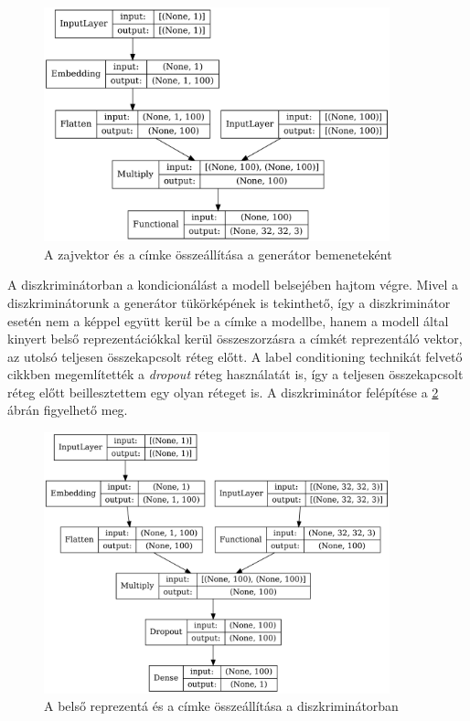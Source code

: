 \begin{figure}[h]
	\centering
	\includegraphics[width=10cm]{images/label_noise_embedding.png}
	\caption{A zajvektor és a címke összeállítása a generátor bemeneteként}
	\label{fig:labelnoiseembedding}
\end{figure}

A diszkriminátorban a kondicionálást a modell belsejében hajtom végre. Mivel a diszkriminátorunk a generátor tükörképének is tekinthető, így a diszkriminátor esetén nem a képpel együtt kerül be a címke a modellbe, hanem a modell által kinyert belső reprezentációkkal kerül összeszorzásra a címkét reprezentáló vektor, az utolsó teljesen összekapcsolt réteg előtt. A label conditioning technikát felvető cikkben megemlítették a \textit{dropout} réteg használatát is, így a teljesen összekapcsolt réteg előtt beillesztettem egy olyan réteget is.
A diszkriminátor felépítése a \ref{fig:labeldiscriminator} ábrán figyelhető meg.

\begin{figure}[h]
	\centering
	\includegraphics[width=10cm]{images/label_discriminator.png}
	\caption{A belső reprezentá és a címke összeállítása a diszkriminátorban}
	\label{fig:labeldiscriminator}
\end{figure}

